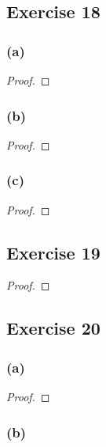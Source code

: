 \documentclass[14pt]{extarticle}
\begin{document}
\subsection{Exercise 18}

\subsubsection{(a)}

\begin{proof}

\end{proof}

\subsubsection{(b)}

\begin{proof}

\end{proof}

\subsubsection{(c)}

\begin{proof}

\end{proof}

\subsection{Exercise 19}

\begin{proof}

\end{proof}

\subsection{Exercise 20}

\subsubsection{(a)}

\begin{proof}

\end{proof}

\subsubsection{(b)}
\end{document}
